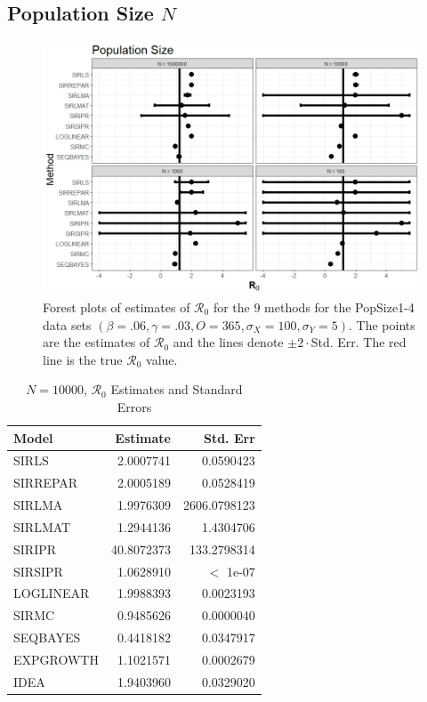 \documentclass[12pt]{article}
\newcommand{\xxsir}{\ensuremath{9} } %
\newcommand{\rr}{\ensuremath{\mathcal{R}_0}}
\begin{document}
\subsection{Population Size $N$}\label{sec:res-n}

\begin{figure}[H]
	\centering
	\includegraphics[scale=0.5]{images/popsize.jpeg}
	\caption{Forest plots of estimates of $\rr$ for the \xxsir methods for the PopSize1-4 data sets $(\beta=.06, \gamma=.03, O=365, \sigma_X=100, \sigma_Y=5)$.  The points are the estimates of $\rr$ and the lines denote $\pm 2\cdot $Std. Err.  The red line is the true $\rr$ value.}\label{fig:inits-res}
\end{figure}

\begin{table}[H]
	
	\centering
	\begin{tabular}[t]{l|r|r}
		\hline
		Model & Estimate & Std. Err\\
		\hline
		SIRLS & 2.0007741 & 0.0590423\\
		\hline
		SIRREPAR & 2.0005189 & 0.0528419\\
		\hline
		SIRLMA & 1.9976309 & 2606.0798123\\
		\hline
		SIRLMAT & 1.2944136 & 1.4304706\\
		\hline
		SIRIPR & 40.8072373 & 133.2798314\\
		\hline
		SIRSIPR & 1.0628910 &  $<$ 1e-07\\
		\hline
		LOGLINEAR & 1.9988393 & 0.0023193\\
		\hline
		SIRMC & 0.9485626 & 0.0000040\\
		\hline
		SEQBAYES & 0.4418182 & 0.0347917\\
		\hline
		EXPGROWTH & 1.1021571 & 0.0002679\\
		\hline
		IDEA & 1.9403960 & 0.0329020\\
		\hline
	\end{tabular}
\caption{$N = 10000$, $\rr$ Estimates and Standard Errors}\label{tab:n1-res2}
\end{table}
\end{document}
